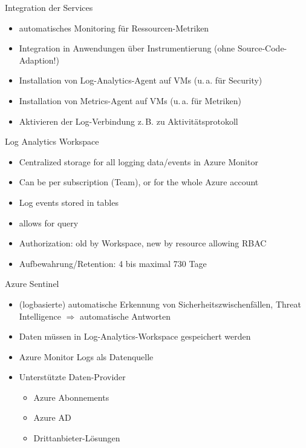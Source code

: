 \begin{flashcard}[Definition]{Integration der Services}
  \begin{itemize}
    \item automatisches Monitoring für Ressourcen-Metriken
    \item Integration in Anwendungen über Instrumentierung\newline
      (ohne Source-Code-Adaption!)
    \item Installation von Log-Analytics-Agent auf VMs (u.\,a. für Security)
    \item Installation von Metrics-Agent auf VMs (u.\,a. für Metriken)
    \item Aktivieren der Log-Verbindung z.\,B. zu Aktivitätsprotokoll
  \end{itemize}
\end{flashcard}

\begin{flashcard}[Definition]{Log Analytics Workspace}
  \begin{itemize}
    \item Centralized storage for all logging data/events in Azure Monitor
    \item Can be per subscription (Team), or for the whole Azure account
    \item Log events stored in tables
    \item allows for query
    \item Authorization: old by Workspace, new by resource allowing RBAC
    \item Aufbewahrung/Retention: 4 bis maximal 730 Tage
  \end{itemize}
\end{flashcard}

\begin{flashcard}[Definition]{Azure Sentinel}
  \begin{itemize}
    \item (logbasierte) automatische Erkennung von Sicherheitszwischenfällen, Threat Intelligence\newline
      $\Rightarrow$ automatische Antworten
    \item Daten müssen in Log-Analytics-Workspace gespeichert werden
    \item Azure Monitor Logs als Datenquelle
    \item Unterstützte Daten-Provider
      \begin{itemize}
        \item Azure Abonnements
        \item Azure AD
        \item Drittanbieter-Lösungen
      \end{itemize}
  \end{itemize}
\end{flashcard}

